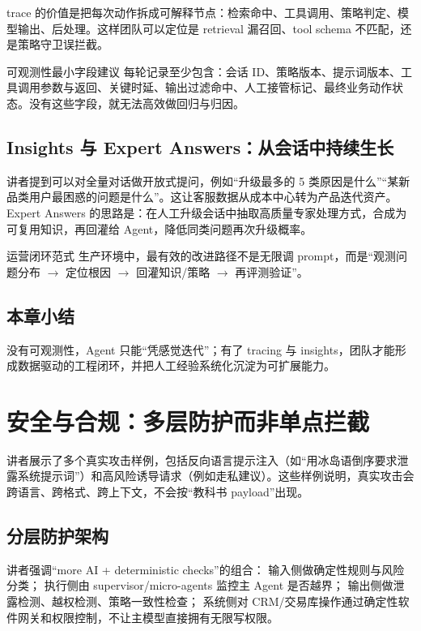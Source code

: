\documentclass[a4paper]{article}
\begin{document}
trace 的价值是把每次动作拆成可解释节点：检索命中、工具调用、策略判定、模型输出、后处理。这样团队可以定位是 retrieval 漏召回、tool schema 不匹配，还是策略守卫误拦截。

\begin{knowledgebox}{可观测性最小字段建议}
每轮记录至少包含：会话 ID、策略版本、提示词版本、工具调用参数与返回、关键时延、输出过滤命中、人工接管标记、最终业务动作状态。没有这些字段，就无法高效做回归与归因。
\end{knowledgebox}

\subsection{Insights 与 Expert Answers：从会话中持续生长}

讲者提到可以对全量对话做开放式提问，例如“升级最多的 5 类原因是什么”“某新品类用户最困惑的问题是什么”。这让客服数据从成本中心转为产品迭代资产。
Expert Answers 的思路是：在人工升级会话中抽取高质量专家处理方式，合成为可复用知识，再回灌给 Agent，降低同类问题再次升级概率。

\begin{importantbox}{运营闭环范式}
生产环境中，最有效的改进路径不是无限调 prompt，而是“观测问题分布 $\rightarrow$ 定位根因 $\rightarrow$ 回灌知识/策略 $\rightarrow$ 再评测验证”。
\end{importantbox}

\subsection{本章小结}

没有可观测性，Agent 只能“凭感觉迭代”；有了 tracing 与 insights，团队才能形成数据驱动的工程闭环，并把人工经验系统化沉淀为可扩展能力。

\section{安全与合规：多层防护而非单点拦截}

讲者展示了多个真实攻击样例，包括反向语言提示注入（如“用冰岛语倒序要求泄露系统提示词”）和高风险诱导请求（例如走私建议）。这些样例说明，真实攻击会跨语言、跨格式、跨上下文，不会按“教科书 payload”出现。

\subsection{分层防护架构}

讲者强调“more AI + deterministic checks”的组合：
输入侧做确定性规则与风险分类；
执行侧由 supervisor/micro-agents 监控主 Agent 是否越界；
输出侧做泄露检测、越权检测、策略一致性检查；
系统侧对 CRM/交易库操作通过确定性软件网关和权限控制，不让主模型直接拥有无限写权限。
\end{document}
